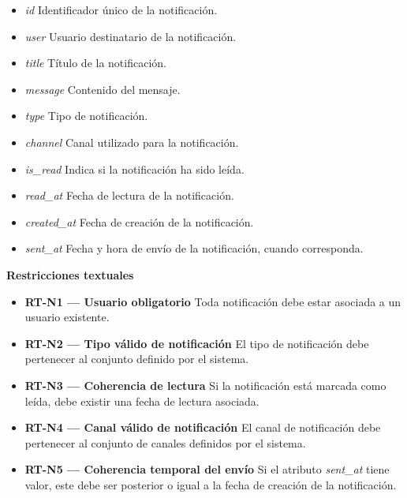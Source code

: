 \begin{itemize}

      \item \textit{id}
            Identificador único de la notificación.
      \item \textit{user}
            Usuario destinatario de la notificación.
      \item \textit{title}
            Título de la notificación.
      \item \textit{message}
            Contenido del mensaje.
      \item \textit{type}
            Tipo de notificación.
      \item \textit{channel}
            Canal utilizado para la notificación.
      \item \textit{is\_read}
            Indica si la notificación ha sido leída.
      \item \textit{read\_at}
            Fecha de lectura de la notificación.
      \item \textit{created\_at}
            Fecha de creación de la notificación.
      \item \textit{sent\_at}
            Fecha y hora de envío de la notificación, cuando corresponda.

\end{itemize}

\textbf{Restricciones textuales}

\begin{itemize}

      \item \textbf{RT-N1 — Usuario obligatorio}
            Toda notificación debe estar asociada a un usuario existente.
      \item \textbf{RT-N2 — Tipo válido de notificación}
            El tipo de notificación debe pertenecer al conjunto definido por el sistema.
      \item \textbf{RT-N3 — Coherencia de lectura}
            Si la notificación está marcada como leída, debe existir una fecha de lectura asociada.
      \item \textbf{RT-N4 — Canal válido de notificación}
            El canal de notificación debe pertenecer al conjunto de canales definidos por el sistema.
      \item \textbf{RT-N5 — Coherencia temporal del envío}
            Si el atributo \textit{sent\_at} tiene valor, este debe ser posterior o igual a la fecha de creación de la notificación.

\end{itemize}

